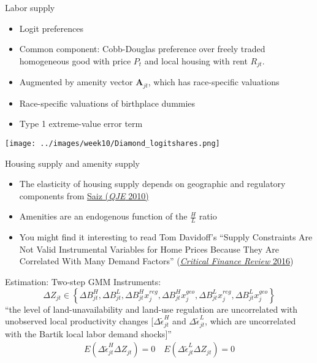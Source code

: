 \documentclass[11pt,notes=hide,aspectratio=169]{beamer}
\begin{document}
\begin{frame}{Labor supply}
\begin{itemize}
	\item Logit preferences
	\item Common component: Cobb-Douglas preference over freely traded homogeneous good with price $P_t$ and local housing with rent $R_{jt}$.
	\item Augmented by amenity vector $\mathbf{A}_{jt}$, which has race-specific valuations
	\item Race-specific valuations of birthplace dummies
	\item Type 1 extreme-value error term
\end{itemize}
\begin{center}
\texttt{[image: ../images/week10/Diamond\_logitshares.png]}
\end{center}
\end{frame}
\begin{frame}{Housing supply and amenity supply}
\begin{itemize}
	\item The elasticity of housing supply depends on geographic and regulatory components from \href{https://doi.org/10.1162/qjec.2010.125.3.1253}{Saiz (\textit{QJE} 2010)}
	\item Amenities are an endogenous function of the $\frac{H}{L}$ ratio
	\item You might find it interesting to read Tom Davidoff's ``Supply Constraints Are Not Valid Instrumental Variables for Home Prices Because They Are Correlated With Many Demand Factors'' (\href{https://www.nowpublishers.com/article/Details/CFR-0037}{\textit{Critical Finance Review} 2016})
\end{itemize}
\end{frame}
\begin{frame}[plain]{Estimation: Two-step GMM}
{\footnotesize
Instruments:
\begin{equation*}
\Delta Z_{jt} \in \left\{
\Delta B^{H}_{jt}, 
\Delta B^{L}_{jt}, 
\Delta B^{H}_{jt} x^{reg}_{j}, 
\Delta B^{H}_{jt} x^{geo}_{j}, 
\Delta B^{L}_{jt} x^{reg}_{j}, 
\Delta B^{L}_{jt} x^{geo}_{j}
\right\}
\end{equation*}
``the level of land-unavailability and land-use regulation are uncorrelated with unobserved local productivity changes [$\Delta \tilde{\epsilon}_{jt}^{H}$ and $\Delta \tilde{\epsilon}_{jt}^{L}$, which are uncorrelated with the Bartik local labor demand shocks]''
\begin{align*}
E \left(\Delta \tilde{\epsilon}_{jt}^{H} \Delta Z_{jt}\right) = 0 
\quad
E \left(\Delta \tilde{\epsilon}_{jt}^{L} \Delta Z_{jt}\right) = 0 
\end{align*}
}
\end{frame}
\end{document}
